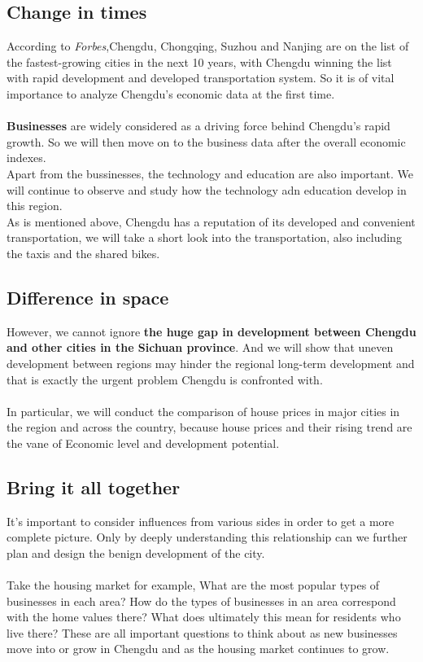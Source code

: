 \documentclass{article}
\begin{document}
\subsection{Change in times}
According to \textit{Forbes},Chengdu, Chongqing, Suzhou and Nanjing are on the list of the fastest-growing cities in the next 10 years, with Chengdu winning the list with rapid development and developed transportation system. So it is of vital importance to analyze Chengdu's economic data at the first time.\\
\\
\textbf{Businesses} are widely considered as a driving force behind Chengdu's rapid growth. So we will then move on to the business data after the overall economic indexes.\\
Apart from the bussinesses, the technology and education are also important. We will continue to observe and study how the technology adn education develop in this region.\\
As is mentioned above, Chengdu has a reputation of its developed and convenient transportation, we will take a short look into the transportation, also including the taxis and the shared bikes.\\
\subsection{Difference in space}
However, we cannot ignore \textbf{the huge gap in development between Chengdu and other cities in the Sichuan province}. And we will show that uneven development between regions may hinder the regional long-term development and that is exactly the urgent problem Chengdu is confronted with. \\
\\
In particular, we will conduct the comparison of house prices in major cities in the region and across the country, because house prices and their rising trend are the vane of Economic level and development potential.
\\
\subsection{Bring it all together}
 It's important to consider influences from various sides in order to get a more complete picture. Only by deeply understanding this relationship can we further plan and design the benign development of the city.\\
 \\
 Take the housing market for example, What are the most popular types of businesses in each area? How do the types of businesses in an area correspond with the home values there? What does ultimately this mean for residents who live there? These are all important questions to think about as new businesses move into or grow in Chengdu and as the housing market continues to grow.
\end{document}
